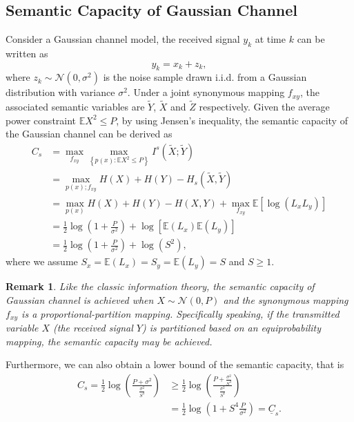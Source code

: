\documentclass[12pt, draftclsnofoot,onecolumn]{IEEEtran}
\newtheorem{remark}{\bf{Remark}}
\begin{document}
\subsection{Semantic Capacity of Gaussian Channel}
Consider a Gaussian channel model, the received signal $y_k$ at time $k$ can be written as
\begin{equation}
y_k=x_k+z_k,
\end{equation}
where $z_k\sim \mathcal{N}(0,\sigma^2)$ is the noise sample drawn i.i.d. from a Gaussian distribution with variance $\sigma^2$. Under a joint synonymous mapping $f_{xy}$, the associated semantic variables are $\tilde{Y}$, $\tilde{X}$ and $\tilde{Z}$ respectively. Given the average power constraint $\mathbb{E}X^2\leq P$, by using Jensen's inequality, the semantic capacity of the Gaussian channel can be derived as
\begin{equation}
\begin{aligned}
C_s&=\max_{f_{xy}}\max_{\left\{p(x): \mathbb{E}X^2\leq P\right\}} I^s(\tilde{X};\tilde{Y})\\
      &=\max_{p(x);f_{xy}} H(X)+H(Y)-H_s(\tilde{X},\tilde{Y}) \\
      &=\max_{p(x)} H(X)+H(Y)-H(X,Y)+\max_{f_{xy}}\mathbb{E}\left[\log (L_xL_y)\right]   \\
      &=\frac{1}{2}\log\left(1+\frac{P}{\sigma^2}\right)+\log \left[\mathbb{E}(L_x) \mathbb{E}(L_y)\right]\\
      &=\frac{1}{2}\log\left(1+\frac{P}{\sigma^2}\right)+\log(S^2),
\end{aligned}
\end{equation}
where we assume $S_x=\mathbb{E}(L_x)=S_y=\mathbb{E}(L_y)=S$ and $S\geq 1$.

\begin{remark}
Like the classic information theory, the semantic capacity of Gaussian channel is achieved when $X\sim \mathcal{N}(0,P)$ and the synonymous mapping $f_{xy}$ is a proportional-partition mapping. Specifically speaking, if the transmitted variable $X$ (the received signal $Y$) is partitioned based on an equiprobability mapping, the semantic capacity may be achieved.
\end{remark}

Furthermore, we can also obtain a lower bound of the semantic capacity, that is
\begin{equation}
\begin{aligned}
C_s=\frac{1}{2}\log\left(\frac{P+\sigma^2}{\frac{\sigma^2}{S^4}}\right) & \geq \frac{1}{2}\log\left(\frac{P+\frac{\sigma^2}{S^4}}{\frac{\sigma^2}{S^4}}\right)\\
&=\frac{1}{2}\log \left(1+S^4\frac{P}{\sigma^2}\right)=\underline{C}_s.
\end{aligned}
\end{equation}
\end{document}
